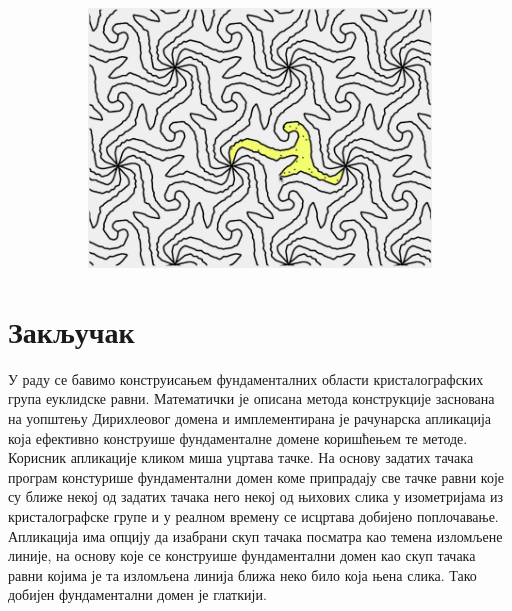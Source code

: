\documentclass[12pt]{report}
\begin{document}
\begin{figure}[H]
\begin{subfigure}[b]{0.33\textwidth}
  
  \end{subfigure}
  \begin{subfigure}[b]{0.33\textwidth}
    \includegraphics[width=.9\textwidth]{sl5.png}

  \end{subfigure}
  
\end{figure}

\chapter {Закључак}
У раду се бавимо конструисањем фундаменталних области кристалографских група еуклидске равни. Математички је описана метода конструкције заснована на уопштењу Дирихлеовог домена и имплементирана је рачунарска апликација која ефективно конструише фундаменталне домене коришћењем те методе. Корисник апликације кликом миша уцртава тачке. На основу задатих тачака програм констурише фундаментални домен коме припрадају све тачке равни које су ближе некој од задатих тачака него некој од њихових слика у изометријама из кристалографске групе и у реалном времену се исцртава добијено поплочавање. Апликација има опцију да изабрани скуп тачака посматра као темена изломљене линије, на основу које се конструише фундаментални домен као скуп тачака равни којима је та изломљена линија ближа неко било која њена слика. Тако добијен фундаментални домен је глаткији. 
\end{document}
